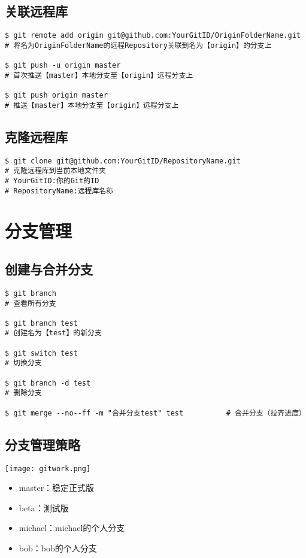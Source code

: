 \documentclass[UTF_8]{ctexart}
\begin{document}
\subsection{关联远程库}
\begin{lstlisting}[frame=shadowbox]
$ git remote add origin git@github.com:YourGitID/OriginFolderName.git
# 将名为OriginFolderName的远程Repository关联到名为【origin】的分支上

$ git push -u origin master
# 首次推送【master】本地分支至【origin】远程分支上

$ git push origin master
# 推送【master】本地分支至【origin】远程分支上
\end{lstlisting}

\subsection{克隆远程库}
\begin{lstlisting}[frame=shadowbox]
$ git clone git@github.com:YourGitID/RepositoryName.git
# 克隆远程库到当前本地文件夹
# YourGitID:你的Git的ID
# RepositoryName:远程库名称
\end{lstlisting}


\clearpage
\section{分支管理}


\subsection{创建与合并分支}
\begin{lstlisting}[frame=shadowbox]
$ git branch																	   # 查看所有分支

$ git branch test															   # 创建名为【test】的新分支

$ git switch test																 # 切换分支

$ git branch -d test												     # 删除分支

$ git merge --no--ff -m "合并分支test" test			 # 合并分支（拉齐进度）
\end{lstlisting}
			
\subsection{分支管理策略}

\centering
\texttt{[image: gitwork.png]}
\begin{itemize}
		\item master：稳定正式版
		\item beta：测试版
		\item michael：michael的个人分支
		\item bob：bob的个人分支
		
\end{itemize}
\end{document}

